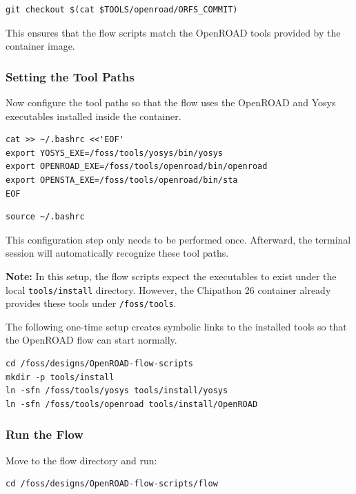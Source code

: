 \documentclass[11pt]{article}
\begin{document}
\begin{lstlisting}
git checkout $(cat $TOOLS/openroad/ORFS_COMMIT)
\end{lstlisting}

This ensures that the flow scripts match the OpenROAD tools provided by the container image.


\subsubsection{Setting the Tool Paths}
Now configure the tool paths so that the flow uses the OpenROAD and Yosys executables installed inside the container.

\begin{lstlisting}
cat >> ~/.bashrc <<'EOF'
export YOSYS_EXE=/foss/tools/yosys/bin/yosys
export OPENROAD_EXE=/foss/tools/openroad/bin/openroad
export OPENSTA_EXE=/foss/tools/openroad/bin/sta
EOF
\end{lstlisting}

\begin{lstlisting}
source ~/.bashrc
\end{lstlisting}

This configuration step only needs to be performed once. Afterward, the terminal session will automatically recognize these tool paths.


\textbf{Note:}
In this setup, the flow scripts expect the executables to exist under the local \texttt{tools/install} directory. However, the Chipathon 26 container already provides these tools under \texttt{/foss/tools}.

The following one-time setup creates symbolic links to the installed tools so that the OpenROAD flow can start normally.

\begin{lstlisting}
cd /foss/designs/OpenROAD-flow-scripts
mkdir -p tools/install
ln -sfn /foss/tools/yosys tools/install/yosys
ln -sfn /foss/tools/openroad tools/install/OpenROAD
\end{lstlisting}



\subsubsection{Run the Flow}

Move to the flow directory and run:

\begin{lstlisting}
cd /foss/designs/OpenROAD-flow-scripts/flow
\end{lstlisting}
\end{document}
